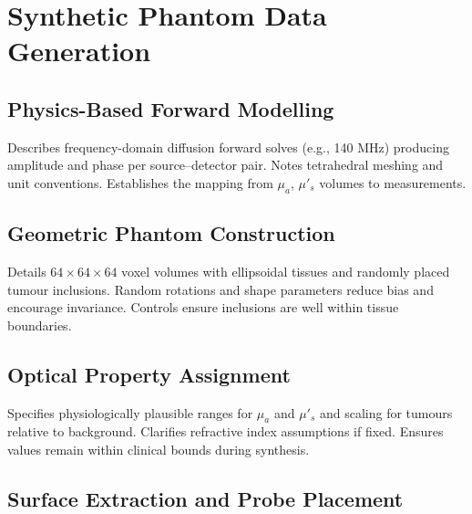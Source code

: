 
\chapter{Synthetic Phantom Data Generation}

\section{Physics-Based Forward Modelling}

Describes frequency-domain diffusion forward solves (e.g., 140 MHz) producing amplitude and phase per source–detector pair. Notes tetrahedral meshing and unit conventions. Establishes the mapping from $\mu_a$, $\mu'_s$ volumes to measurements.


\section{Geometric Phantom Construction}

Details $64 \times 64 \times 64$ voxel volumes with ellipsoidal tissues and randomly placed tumour inclusions. Random rotations and shape parameters reduce bias and encourage invariance. Controls ensure inclusions are well within tissue boundaries.


\section{Optical Property Assignment}

Specifies physiologically plausible ranges for $\mu_a$ and $\mu'_s$ and scaling for tumours relative to background. Clarifies refractive index assumptions if fixed. Ensures values remain within clinical bounds during synthesis.


\section{Surface Extraction and Probe Placement}

